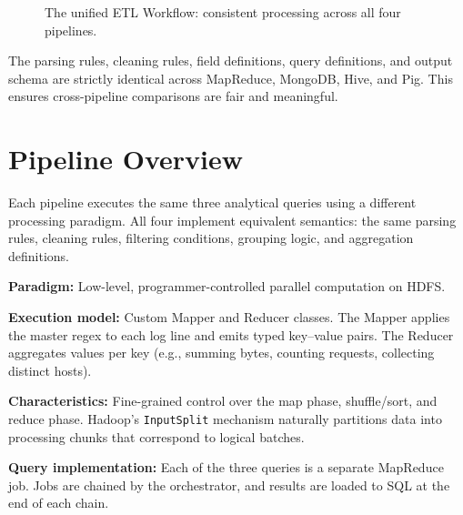 \documentclass[11pt,a4paper]{article}
\begin{document}
\begin{figure}[H]
{
}
\caption{The unified ETL Workflow: consistent processing across all four pipelines.}
\label{fig:refined_etl}
\end{figure}

\begin{notebox}
The parsing rules, cleaning rules, field definitions, query definitions, and output schema are strictly identical across MapReduce, MongoDB, Hive, and Pig. This ensures cross-pipeline comparisons are fair and meaningful.
\end{notebox}
\section{Pipeline Overview}

Each pipeline executes the same three analytical queries using a different processing paradigm. All four implement equivalent semantics: the same parsing rules, cleaning rules, filtering conditions, grouping logic, and aggregation definitions.

\begin{mrbox}
\textbf{Paradigm:} Low-level, programmer-controlled parallel computation on HDFS.

\textbf{Execution model:} Custom Mapper and Reducer classes. The Mapper applies the master regex to each log line and emits typed key--value pairs. The Reducer aggregates values per key (e.g., summing bytes, counting requests, collecting distinct hosts).

\textbf{Characteristics:} Fine-grained control over the map phase, shuffle/sort, and reduce phase. Hadoop's \texttt{InputSplit} mechanism naturally partitions data into processing chunks that correspond to logical batches.

\textbf{Query implementation:} Each of the three queries is a separate MapReduce job. Jobs are chained by the orchestrator, and results are loaded to SQL at the end of each chain.
\end{mrbox}
\end{document}

